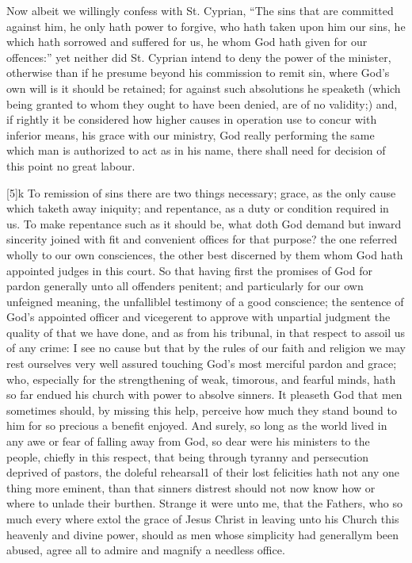 Now albeit we willingly confess with St. Cyprian, “The sins that are committed against him, he only hath power to forgive, who hath taken upon him our sins, he which hath sorrowed and suffered for us, he whom God hath given for our offences:” yet neither did St. Cyprian intend to deny  the power of the minister, otherwise than if he presume beyond his commission to remit sin, where God’s own will is it should be retained; for against such absolutions he speaketh (which being granted to whom they ought to have been denied, are of no validity;) and, if rightly it be considered how higher causes in operation use to concur with inferior means, his grace with our ministry, God really performing the same which man is authorized to act as in his name, there shall need for decision of this point no great labour.

[5]k To remission of sins there are two things necessary; grace, as the only cause which taketh away iniquity; and repentance, as a duty or condition required in us. To make repentance such as it should be, what doth God demand but inward sincerity joined with fit and convenient offices for that purpose? the one referred wholly to our own consciences, the other best discerned by them whom God hath appointed judges in this court. So that having first the promises of God for pardon generally unto all offenders penitent; and particularly for our own unfeigned meaning, the unfalliblel testimony of a good conscience; the sentence of God’s appointed officer and vicegerent to approve with unpartial judgment the quality of that we have done, and as from his tribunal, in that respect to assoil us of any crime: I see no cause but that by the rules of our faith and religion we may rest ourselves very well assured touching God’s most merciful pardon and grace; who, especially for the strengthening of weak, timorous, and fearful minds, hath so far endued his church with power to absolve sinners. It pleaseth God that men sometimes should, by missing this help, perceive how much they stand bound to him for so precious a benefit enjoyed. And surely, so long as the world lived in any awe or fear of falling away from God, so dear were his ministers to the people, chiefly in this respect, that being through tyranny and persecution deprived of pastors, the doleful rehearsal1 of  their lost felicities hath not any one thing more eminent, than that sinners distrest should not now know how or where to unlade their burthen. Strange it were unto me, that the Fathers, who so much every where extol the grace of Jesus Christ in leaving unto his Church this heavenly and divine power, should as men whose simplicity had generallym been abused, agree all to admire and magnify a needless office.

